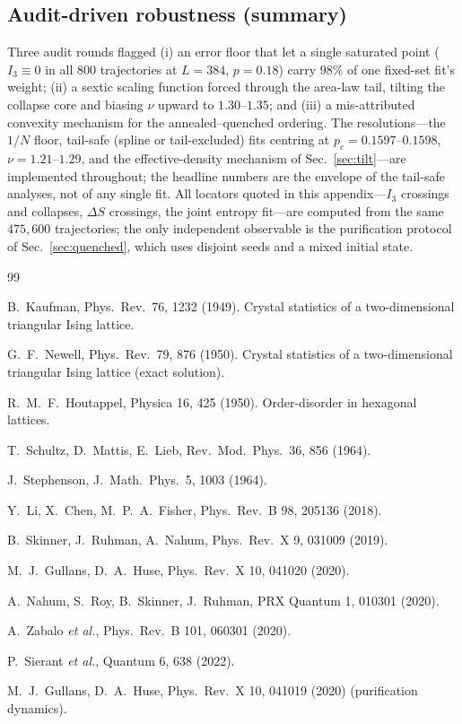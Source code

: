 \documentclass[11pt]{article}
\begin{document}
\subsection{Audit-driven robustness (summary)}
Three audit rounds flagged (i) an error floor that let a single saturated
point ($I_3\equiv0$ in all $800$ trajectories at $L=384$, $p=0.18$) carry
$98\%$ of one fixed-set fit's weight; (ii) a sextic scaling function forced
through the area-law tail, tilting the collapse core and biasing
$\nu$ upward to $1.30$--$1.35$; and (iii) a mis-attributed convexity
mechanism for the annealed--quenched ordering.  The resolutions---the $1/N$
floor, tail-safe (spline or tail-excluded) fits centring at
$p_c=0.1597$--$0.1598$, $\nu=1.21$--$1.29$, and the effective-density
mechanism of Sec.~\ref{sec:tilt}---are implemented throughout; the headline
numbers are the envelope of the tail-safe analyses, not of any single fit.
All locators quoted in this appendix---$I_3$ crossings and collapses,
$\Delta S$ crossings, the joint entropy fit---are computed from the same
$475{,}600$ trajectories; the only independent observable is the
purification protocol of Sec.~\ref{sec:quenched}, which uses disjoint seeds
and a mixed initial state.


\begin{thebibliography}{99}

B.~Kaufman, Phys.\ Rev.\ 76, 1232 (1949). Crystal statistics of a
two-dimensional triangular Ising lattice.

G.~F.~Newell, Phys.\ Rev.\ 79, 876 (1950). Crystal statistics of a
two-dimensional triangular Ising lattice (exact solution).

R.~M.~F.~Houtappel, Physica 16, 425 (1950). Order-disorder in hexagonal
lattices.

T.~Schultz, D.~Mattis, E.~Lieb, Rev.\ Mod.\ Phys.\ 36, 856 (1964).

J.~Stephenson, J.\ Math.\ Phys.\ 5, 1003 (1964).

Y.~Li, X.~Chen, M.~P.~A.~Fisher, Phys.\ Rev.\ B 98, 205136 (2018).

B.~Skinner, J.~Ruhman, A.~Nahum, Phys.\ Rev.\ X 9, 031009 (2019).

M.~J.~Gullans, D.~A.~Huse, Phys.\ Rev.\ X 10, 041020 (2020).

A.~Nahum, S.~Roy, B.~Skinner, J.~Ruhman, PRX Quantum 1, 010301 (2020).

A.~Zabalo \emph{et al.}, Phys.\ Rev.\ B 101, 060301 (2020).

P.~Sierant \emph{et al.}, Quantum 6, 638 (2022).

M.~J.~Gullans, D.~A.~Huse, Phys.\ Rev.\ X 10, 041019 (2020) (purification
dynamics).

\end{thebibliography}
\end{document}
